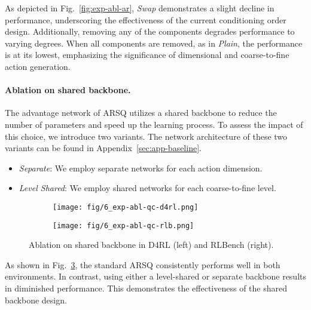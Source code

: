 As depicted in Fig.~\ref{fig:exp-abl-ar}, \textit{Swap} demonstrates a slight decline in performance, underscoring the effectiveness of the current conditioning order design.
Additionally, removing any of the components degrades performance to varying degrees.
When all components are removed, as in \textit{Plain}, the performance is at its lowest, emphasizing the significance of dimensional and coarse-to-fine action generation.

\paragraph{Ablation on shared backbone.}
The advantage network of ARSQ utilizes a shared backbone to reduce the number of parameters and speed up the learning process. 
To assess the impact of this choice, we introduce two variants. The network architecture of these two variants can be found in Appendix~\ref{sec:app-baseline}.
\vspace{-2mm}
\begin{itemize}\setlength{\itemsep}{0pt}
\item \textit{Separate}: We employ separate networks for each action dimension.
\item \textit{Level Shared}: We employ shared networks for each coarse-to-fine level.
\end{itemize}


\begin{figure}[h]
    \vspace{-0.5em}
    \centering
    \begin{subfigure}[t]{0.22\textwidth}
        \centering
        \texttt{[image: fig/6\_exp-abl-qc-d4rl.png]}
        \label{fig:exp-abl-qc-d4rl}
    \end{subfigure}
    \hspace{0.01\textwidth}
    \begin{subfigure}[t]{0.22\textwidth}
        \centering
        \texttt{[image: fig/6\_exp-abl-qc-rlb.png]}
        \label{fig:exp-abl-qc-rlb}
    \end{subfigure}
    \vspace{-1em}
    \caption{Ablation on shared backbone in D4RL (left) and RLBench (right).}
    \label{fig:exp-abl-qc}
\end{figure}

As shown in Fig.~\ref{fig:exp-abl-qc}, the standard ARSQ consistently performs well in both environments. In contrast, using either a level-shared or separate backbone results in diminished performance.
This demonstrates the effectiveness of the shared backbone design. 
